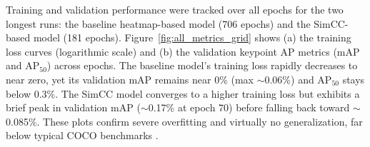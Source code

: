 Training and validation performance were tracked over all epochs for the two longest runs: the baseline heatmap-based model (706 epochs) and the SimCC-based model (181 epochs). Figure~\ref{fig:all_metrics_grid} shows (a) the training loss curves (logarithmic scale) and (b) the validation keypoint AP metrics (mAP and AP$_{50}$) across epochs. The baseline model’s training loss rapidly decreases to near zero, yet its validation mAP remains near 0\% (max $\sim$0.06\%) and AP$_{50}$ stays below 0.3\%. The SimCC model converges to a higher training loss but exhibits a brief peak in validation mAP ($\sim$0.17\% at epoch 70) before falling back toward $\sim$0.085\%. These plots confirm severe overfitting and virtually no generalization, far below typical COCO benchmarks \cite{Lin2014COCO}.

\begin{figure}[htp]
  \centering
  \captionsetup[sub]{justification=centering}  %


\end{figure}
